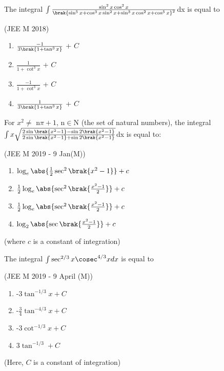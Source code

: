 	\item The integral $\int\frac{\sin^2x\cos^2x}{\brak{\sin^5x+\cos^3x\sin^2x+\sin^3x\cos^2x+\cos^5x}^2}$dx is equal to

		\hfill{(JEE M 2018)}
		
		\begin{multicols}{2}
			\begin{enumerate}
				\item $\frac{-1}{3\brak{1+\tan ^3x}}$ + $C$
				\item $\frac{1}{1+\cot ^3x}$ + $C$
				\item $\frac{-1}{1+\cot ^3x}$ + $C$
				\item $\frac{1}{3\brak{1+\tan ^3x}}$ + $C$
			\end{enumerate}
		\end{multicols}
		
	\item For $x^2\neq$ n$\pi+1$, n$\in$N (the set of natural numbers), the integral $\int x\sqrt{\frac{2\sin \brak{x^2-1}-\sin 2\brak{x^2-1}}{2\sin \brak{x^2-1}+\sin 2\brak{x^2-1}}}$dx is equal to:

		\hfill{(JEE M 2019 - 9 Jan(M))}

		\begin{multicols}{1}
			\begin{enumerate}
				\item $\log_e\abs{\frac{1}{2}\sec ^2\brak{x^2-1}} + c$
				\item $\frac{1}{2}\log_e\abs{\sec ^2\brak{\frac{x^2-1}{2}}} + c$
				\item $\frac{1}{2}\log_e\abs{\sec ^2\brak{\frac{x^2-1}{2}}} + c$
				\item $\log_2\abs{\sec \brak{\frac{x^2-1}{2}}} + c$
			\end{enumerate}
		\end{multicols}
		(where $c$ is a constant of integration)

	\item The integral $\int \sec ^{2/3}x\cosec ^{4/3}x dx$ is equal to

		\hfill{(JEE M 2019 - 9 April (M))}

		\begin{multicols}{2}
			\begin{enumerate}
				\item -3$\tan ^{-1/3}x+C$
				\item -$\frac{3}{4}\tan ^{-4/3}x+C$
				\item -3$\cot ^{-1/3}x+C$
				\item 3$\tan ^{-1/3}+C$
			\end{enumerate}
		\end{multicols}
		(Here, $C$ is a constant of integration)

